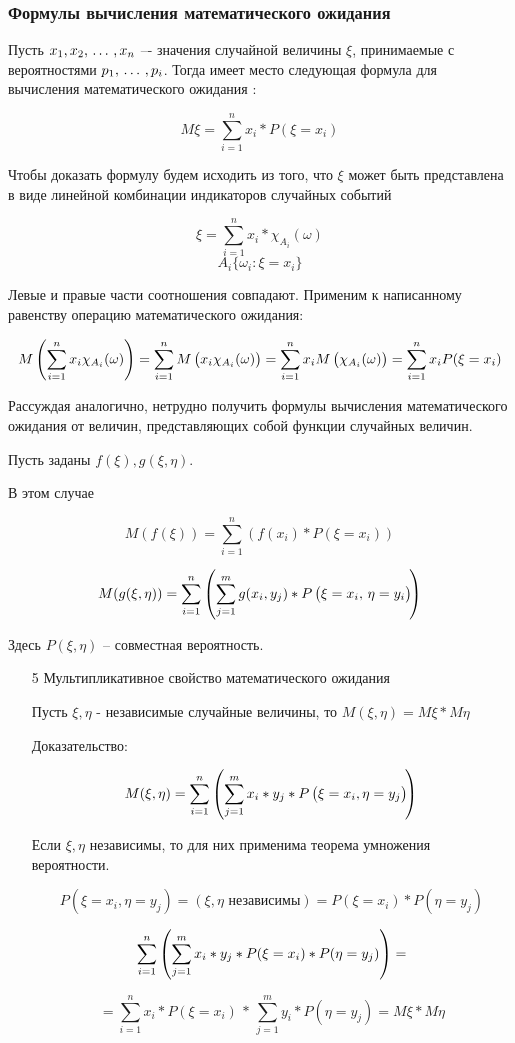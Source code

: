 ﻿\documentclass[a4paper,12pt]{report}
\begin{document}
\subsubsection{Формулы вычисления математического ожидания}

	Пусть $x_1,x_2, \,\ldots\, ,x_n$ –-  значения случайной величины $\xi$, принимаемые с вероятностями $p_1, \,\ldots\, ,p_i$. Тогда имеет место следующая формула для вычисления математического ожидания :

	$$
	  M\xi=\sum^n_{i=1}x_i*P(\xi=x_i)
	$$

	Чтобы доказать формулу будем исходить из того, что $\xi$ может быть представлена в виде линейной комбинации индикаторов случайных событий

	$$
	  \xi = \sum^n_{i=1}x_i*\chi_{A_i}(\omega)
	$$ $$
	  A_i \{\omega_i : \xi = x_i\}
	$$

	Левые и правые части соотношения совпадают. Применим к написанному равенству операцию математического ожидания: 

	$$	
	  M\left(\sum^n_{i=1}x_i\chi_{A_i}(\omega)\right) 
	    = \sum^n_{i=1}M\left(x_i\strut\chi_{A_i}(\omega)\right) 
	    = \sum^n_{i=1}x_iM\left(\strut\chi_{A_i}(\omega)\right) 
	    = \sum^n_{i=1}x_iP(\xi=x_i)	
	$$

	Рассуждая аналогично, нетрудно получить формулы вычисления математического ожидания от величин, представляющих собой функции случайных величин. 

	Пусть заданы $f(\xi),g(\xi,\eta)$.

	В этом случае 

	$$
	  M(f(\xi)) = \sum^n_{i=1}\left(f(x_i)*P(\xi=x_i)\right) 
	$$

	$$
	  M(g(\xi,\eta)) = \sum^n_{i=1}
	    \left(   
	      \sum^m_{j=1}g(x_i,y_j)*P
	        \left(
	          \xi=x_i,\strut\,\eta=y_i
	        \right) \!
	    \right) 
	$$

	Здесь $P(\xi,\eta)$ – совместная вероятность.


	\begin{enumerate}

	\item[5] Мультипликативное свойство математического ожидания

		Пусть $\xi,\eta$ - независимые случайные величины, то $M(\xi,\eta) =  M\xi * M\eta$

		Доказательство:

		$$
		  M(\xi,\eta) = \sum^n_{i=1}
		    \left(
		      \sum^m_{j=1}x_i*y_j*\strut P
		        \left(
		          \xi=x_i,\strut\eta=y_j
		        \right) \!
		    \right)
		$$

		Если $\xi,\eta$ независимы, то для них применима теорема умножения вероятности. 

		$$
		  P(\xi=x_i,\eta=y_j) 
		    = (\xi,\eta \mbox{ независимы})
		    = P(\xi=x_i)*P(\eta=y_j)
		$$
		
		$$
		  \sum^n_{i=1}
		    \left(
		      \sum^m_{j=1}x_i*y_j*\strut P(\xi=x_i)*P(\eta=y_j)
		    \right)
		  =
		$$
		
		$$
		  = \sum^n_{i=1}x_i*P(\xi=x_i)  \, * \, 
		    \sum^m_{j=1}y_i*P(\eta=y_j) 
		  = M\xi*M\eta
		$$

	\end{enumerate}
\end{document}
